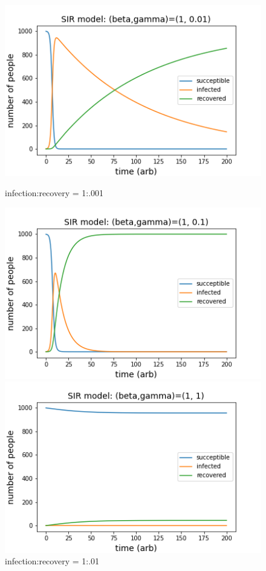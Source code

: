 \documentclass{article}
\begin{document}
\begin{figure}[!htb]
   \begin{minipage}{0.48\textwidth}
     \centering
     \includegraphics[width=1\linewidth]{fig31.png}
     \caption{infection:recovery = 1:.001}
   \end{minipage}\hfill
   \begin{minipage}{0.48\textwidth}
     \centering
     \includegraphics[width=1\linewidth]{fig32.png}
     \caption{infection:recovery = 1:.01}
   \end{minipage}
   \begin{minipage}{0.48\textwidth}
     \centering
     \includegraphics[width=1\linewidth]{fig33.png}

\end{minipage}
\end{figure}
\end{document}
